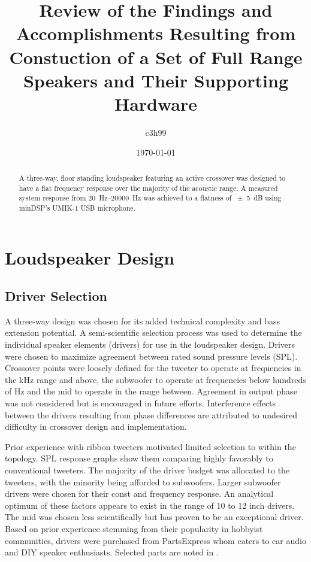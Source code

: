 \documentclass{StdTemplate} %
\title{Review of the Findings and Accomplishments Resulting from Constuction of a Set of Full Range Speakers and Their Supporting Hardware}
\author{c3h99}
\date{\today}
\begin{document}
\TitlePage
%
\begin{abstract}
A three-way, floor standing loudspeaker featuring an active crossover was designed to have a flat frequency response over the majority of the acoustic range. A measured system response from \SIrange{20}{20000}{\hertz} was achieved to a flatness of \SI{\pm 5}{\dB} using minDSP’s UMIK-1 USB microphone.
\end{abstract}
%
%


%
\section{Loudspeaker Design}
%
\subsection{Driver Selection}
A three-way design was chosen for its added technical complexity and bass extension potential. A semi-scientific selection process was used to determine the individual speaker elements (drivers) for use in the loudspeaker design. Drivers were chosen to maximize agreement between rated sound pressure levels (SPL). Crossover points were loosely defined for the tweeter to operate at frequencies in the \si{\kilo\hertz} range and above, the subwoofer to operate at frequencies below hundreds of \si{Hz} and the mid to operate in the range between. Agreement in output phase was not considered but is encouraged in future efforts. Interference effects between the drivers resulting from phase differences are attributed to undesired difficulty in crossover design and implementation. \par
%
Prior experience with ribbon tweeters motivated limited selection to within the topology. SPL response graphs show them comparing highly favorably to conventional tweeters. The majority of the driver budget was allocated to the tweeters, with the minority being afforded to subwoofers. Larger subwoofer drivers were chosen for their const and frequency response. An analytical optimum of these factors appears to exist in the range of 10 to 12 inch drivers. The mid was chosen less scientifically but has proven to be an exceptional driver. Based on prior experience stemming from their popularity in hobbyist communities, drivers were purchased from PartsExpress whom caters to car audio and DIY speaker enthusiasts. Selected parts are noted in .\par
%
\end{document}
